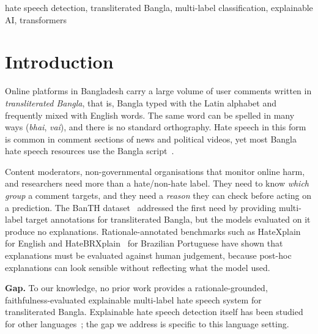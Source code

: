 \documentclass[conference,letterpaper,10pt]{IEEEtran}
\begin{document}
\begin{IEEEkeywords}
hate speech detection, transliterated Bangla, multi-label classification, explainable AI, transformers
\end{IEEEkeywords}

\section{Introduction}

Online platforms in Bangladesh carry a large volume of user comments written in \emph{transliterated Bangla}, that is, Bangla typed with the Latin alphabet and frequently mixed with English words. The same word can be spelled in many ways (\emph{bhai}, \emph{vai}), and there is no standard orthography. Hate speech in this form is common in comment sections of news and political videos, yet most Bangla hate speech resources use the Bangla script~\cite{romim2022bdshs,hasan2026banglamultihate}.

Content moderators, non-governmental organisations that monitor online harm, and researchers need more than a hate/non-hate label. They need to know \emph{which group} a comment targets, and they need a \emph{reason} they can check before acting on a prediction. The BanTH dataset~\cite{haider2025banth} addressed the first need by providing multi-label target annotations for transliterated Bangla, but the models evaluated on it produce no explanations. Rationale-annotated benchmarks such as HateXplain~\cite{mathew2021hatexplain} for English and HateBRXplain~\cite{salles2025hatebrxplain} for Brazilian Portuguese have shown that explanations must be evaluated against human judgement, because post-hoc explanations can look sensible without reflecting what the model used.

\textbf{Gap.} To our knowledge, no prior work provides a rationale-grounded, faithfulness-evaluated explainable multi-label hate speech system for transliterated Bangla. Explainable hate speech detection itself has been studied for other languages~\cite{mathew2021hatexplain,salles2025hatebrxplain,yadav2026userbased}; the gap we address is specific to this language setting.
\end{document}

